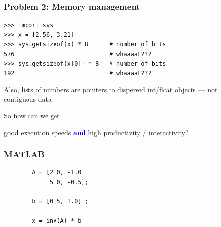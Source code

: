\documentclass[
    xcolor={svgnames,dvipsnames},
    hyperref={colorlinks, citecolor=DeepPink4, linkcolor=DarkRed, urlcolor=DarkBlue}
    ]{beamer}  %
\newcommand{\navy}[1]{\textcolor{Blue}{\bf #1}}
\newcommand{\1}{\mathbbm 1}
\begin{document}
\begin{frame}[fragile]
    \frametitle{Problem 2: Memory management}

    \begin{verbatim}
>>> import sys
>>> x = [2.56, 3.21]
>>> sys.getsizeof(x) * 8      # number of bits
576                           # whaaaat???
>>> sys.getsizeof(x[0]) * 8   # number of bits
192                           # whaaaat???
    \end{verbatim}


    Also, lists of numbers are pointers to dispersed int/float objects ---
    not contiguous data

\end{frame}


\begin{frame}
    
    So how can we get 

    \begin{center}
    good execution speeds \navy{and} high productivity / interactivity?
    \end{center}

\end{frame}



\begin{frame}[fragile]
    \frametitle{MATLAB}

    \begin{verbatim}
        A = [2.0, -1.0
             5.0, -0.5];

        b = [0.5, 1.0]';

        x = inv(A) * b
    \end{verbatim}


\end{frame}
\end{document}
